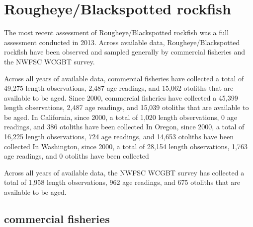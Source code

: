 \documentclass[11pt,
  english,
  letterpaper,
]{article}
\begin{document}

\hypertarget{rougheyeblackspotted-rockfish}{%
\section{Rougheye/Blackspotted rockfish}\label{rougheyeblackspotted-rockfish}}

\leavevmode\tagmcend\tagstructend


The most recent assessment of Rougheye/Blackspotted rockfish was a full assessment conducted in 2013. Across available data, Rougheye/Blackspotted rockfish have been observed and sampled generally by commercial fisheries and the NWFSC WCGBT survey.

\leavevmode\tagmcend\tagstructend\par


Across all years of available data, commercial fisheries have collected a total of 49,275 length observations, 2,487 age readings, and 15,062 otoliths that are available to be aged. Since 2000, commercial fisheries have collected a 45,399 length observations, 2,487 age readings, and 15,039 otoliths that are available to be aged. In California, since 2000, a total of 1,020 length observations, 0 age readings, and 386 otoliths have been collected In Oregon, since 2000, a total of 16,225 length observations, 724 age readings, and 14,653 otoliths have been collected In Washington, since 2000, a total of 28,154 length observations, 1,763 age readings, and 0 otoliths have been collected

\leavevmode\tagmcend\tagstructend\par


Across all years of available data, the NWFSC WCGBT survey has collected a total of 1,958 length observations, 962 age readings, and 675 otoliths that are available to be aged.

\leavevmode\tagmcend\tagstructend\par


\hypertarget{commercial-fisheries-43}{%
\subsection{commercial fisheries}\label{commercial-fisheries-43}}
\end{document}
